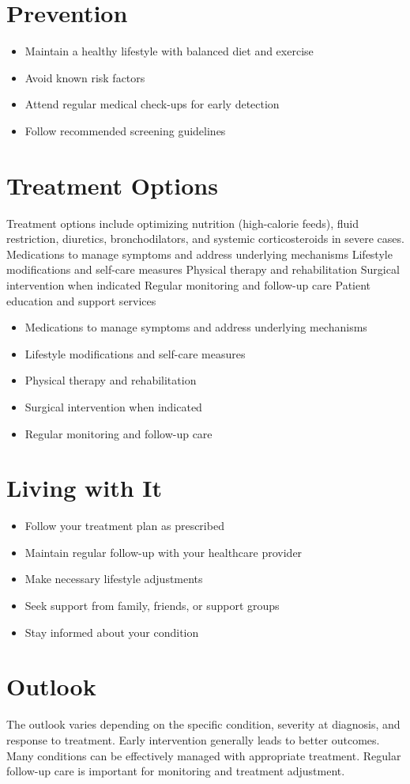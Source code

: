 \section{Prevention}
\begin{itemize}[noitemsep]
  \item Maintain a healthy lifestyle with balanced diet and exercise
  \item Avoid known risk factors
  \item Attend regular medical check-ups for early detection
  \item Follow recommended screening guidelines
\end{itemize}
\section{Treatment Options}
Treatment options include optimizing nutrition (high-calorie feeds), fluid restriction, diuretics, bronchodilators, and systemic corticosteroids in severe cases. Medications to manage symptoms and address underlying mechanisms Lifestyle modifications and self-care measures Physical therapy and rehabilitation Surgical intervention when indicated Regular monitoring and follow-up care Patient education and support services

\begin{itemize}[noitemsep]
  \item Medications to manage symptoms and address underlying mechanisms
  \item Lifestyle modifications and self-care measures
  \item Physical therapy and rehabilitation
  \item Surgical intervention when indicated
  \item Regular monitoring and follow-up care
\end{itemize}
\section{Living with It}
\begin{itemize}[noitemsep]
  \item Follow your treatment plan as prescribed
  \item Maintain regular follow-up with your healthcare provider
  \item Make necessary lifestyle adjustments
  \item Seek support from family, friends, or support groups
  \item Stay informed about your condition
\end{itemize}
\section{Outlook}
The outlook varies depending on the specific condition, severity at diagnosis, and response to treatment. Early intervention generally leads to better outcomes. Many conditions can be effectively managed with appropriate treatment. Regular follow-up care is important for monitoring and treatment adjustment.
